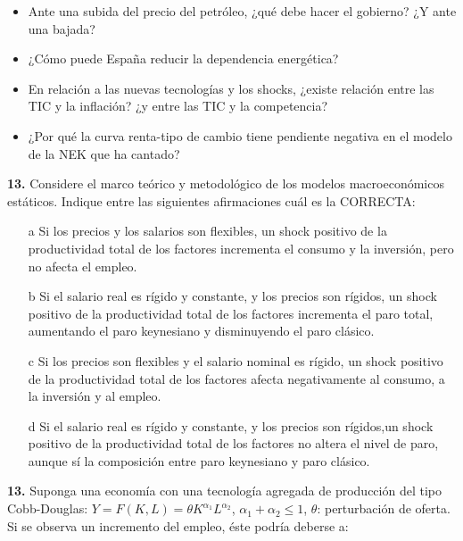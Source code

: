 \documentclass{nuevotema}
\begin{document}
\preguntas




\begin{itemize}
    \item Ante una subida del precio del petróleo, ¿qué debe hacer el gobierno? ¿Y ante una bajada?
    \item ¿Cómo puede España reducir la dependencia energética?
    \item En relación a las nuevas tecnologías y los shocks, ¿existe relación entre las TIC y la inflación? ¿y entre las TIC y la competencia?
    \item ¿Por qué la curva renta-tipo de cambio tiene pendiente negativa en el modelo de la NEK que ha cantado?
\end{itemize}


\textbf{13.} Considere el marco teórico y metodológico de los modelos macroeconómicos estáticos. Indique entre las siguientes afirmaciones cuál es la CORRECTA:

\begin{itemize}
	\item[a] Si los precios y los salarios son flexibles, un shock positivo de la productividad total de los factores incrementa el consumo y la inversión, pero no afecta el empleo.
	\item[b] Si el salario real es rígido y constante, y los precios son rígidos, un shock positivo de la productividad total de los factores incrementa el paro total, aumentando el paro keynesiano y disminuyendo el paro clásico.
	\item[c] Si los precios son flexibles y el salario nominal es rígido, un shock positivo de la productividad total de los factores afecta negativamente al consumo, a la inversión y al empleo.
	\item[d] Si el salario real es rígido y constante, y los precios son rígidos,un shock positivo de la productividad total de los factores no altera el nivel de paro, aunque sí la composición entre paro keynesiano y paro clásico.
\end{itemize}


\textbf{13.} Suponga una economía con una tecnología agregada de producción del tipo Cobb-Douglas: $Y=F(K,L) = \theta K^{\alpha_1} L^{\alpha_2}$, $\alpha_1 + \alpha_2 \leq 1$, $\theta$: perturbación de oferta. Si se observa un incremento del empleo, éste podría deberse a:
\end{document}
